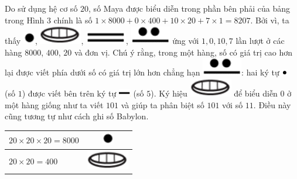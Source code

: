 \begin{multicols}{2}
	Do sử dụng hệ cơ số $20$,  số Maya được biểu diễn trong phần bên phải của bảng trong Hình $3$ chính là số  $1\times 8000+ 0\times 400+ 10\times20+ 7\times1= 8207$. Bởi vì, ta  thấy  \includegraphics[scale=0.3]{33},  \includegraphics[scale=0.3]{34},  \includegraphics[scale=0.3]{35}, \includegraphics[scale=0.3]{36}  ứng với $1, 0, 10, 7$  lần lượt ở các hàng $8000$, $400$, $20$ và đơn vị. Chú ý rằng, trong một hàng, số có giá trị cao hơn lại được viết phía dưới số có giá trị lớn hơn chẳng hạn  \includegraphics[scale=0.3]{36}:  hai ký tự \includegraphics[scale=0.7]{37} (số $1$) được viết bên trên ký tự \includegraphics[scale=0.7]{38} (số $5$). Ký hiệu \includegraphics[scale=0.3]{34} để biểu diễn $0$ ở một hàng giống như ta viết $101$ và giúp ta phân biệt số $101$ với số $11$. Điều này cũng tương tự như cách ghi số Babylon. 
	\begin{table}[H]
		\vspace*{-5pt}
		\centering
		\captionsetup{labelformat= empty, justification=centering}
		\setlength{\tabcolsep}{21pt}
		\renewcommand{\arraystretch}{1.25}
		\begin{tabular}{|l|c|}
			\hline
			$20\times 20\times 20 =8000$  & \includegraphics[scale=0.3]{33} \\
			\hline
			$20\times 20 =400$     & \includegraphics[scale=0.3]{34} \\

\end{tabular}
\end{table}
\end{multicols}
